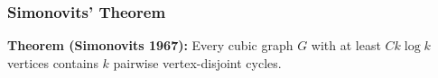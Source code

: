 \documentclass{beamer}
\begin{document}
\begin{frame}
  \frametitle{Simonovits' Theorem}

  \noindent\textbf{Theorem (Simonovits 1967):} Every cubic graph $G$ with at least $C k\log k$ vertices contains $k$ pairwise vertex-disjoint cycles.


\end{frame}
\end{document}

